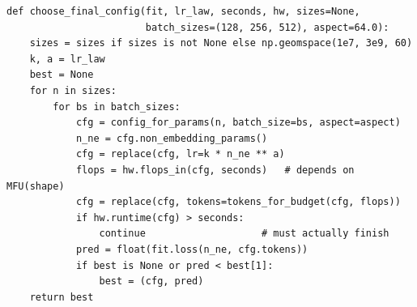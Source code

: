 \begin{lstlisting}[caption={Wall-clock-aware final choice (Lab 12, Task 9).},label={lst:scalinglaws:choose}]
def choose_final_config(fit, lr_law, seconds, hw, sizes=None,
                        batch_sizes=(128, 256, 512), aspect=64.0):
    sizes = sizes if sizes is not None else np.geomspace(1e7, 3e9, 60)
    k, a = lr_law
    best = None
    for n in sizes:
        for bs in batch_sizes:
            cfg = config_for_params(n, batch_size=bs, aspect=aspect)
            n_ne = cfg.non_embedding_params()
            cfg = replace(cfg, lr=k * n_ne ** a)
            flops = hw.flops_in(cfg, seconds)   # depends on MFU(shape)
            cfg = replace(cfg, tokens=tokens_for_budget(cfg, flops))
            if hw.runtime(cfg) > seconds:
                continue                    # must actually finish
            pred = float(fit.loss(n_ne, cfg.tokens))
            if best is None or pred < best[1]:
                best = (cfg, pred)
    return best
\end{lstlisting}


